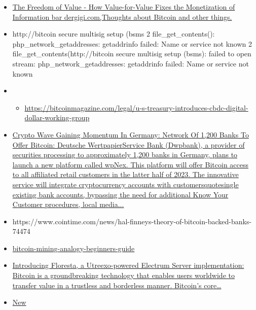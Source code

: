 \begin{itemize}
  \begin{itemize}
  \item
    \href{https://dergigi.com/2021/12/30/the-freedom-of-value/}{The
    Freedom of Value - How Value-for-Value Fixes the Monetization of
    Information bar{} dergigi.com,Thoughts about Bitcoin and other
    things.}
  \item
    http://bitcoin secure multisig setup (bsms 2 file\_get\_contents():
    php\_network\_getaddresses: getaddrinfo failed: Name or service not
    known 2 file\_get\_contents(http://bitcoin secure multisig setup
    (bsms): failed to open stream: php\_network\_getaddresses:
    getaddrinfo failed: Name or service not known
  \item
    \begin{itemize}
     
    \item
      \url{https://bitcoinmagazine.com/legal/u-s-treasury-introduces-cbdc-digital-dollar-working-group}
    \end{itemize}
  \item
    \href{https://www.msn.com/en-us/money/news/crypto-wave-gaining-momentum-in-germany-network-of-1-200-banks-to-offer-bitcoin/ar-AA198Lxc}{Crypto
    Wave Gaining Momentum In Germany: Network Of 1,200 Banks To Offer
    Bitcoin: Deutsche WertpapierService Bank (Dwpbank), a provider of
    securities processing to approximately 1,200 banks in Germany, plans
    to launch a new platform called wpNex. This platform will offer
    Bitcoin access to all affiliated retail customers in the latter half
    of 2023. The innovative service will integrate cryptocurrency
    accounts with customersquotesingle{} existing bank accounts,
    bypassing the need for additional Know Your Customer procedures,
    local media...}
  \item
    https://www.cointime.com/news/hal-finneys-theory-of-bitcoin-backed-banks-74474
  \item
    \href{https://braiins.com/blog/bitcoin-mining-analogy-beginners-guide}{bitcoin-mining-analogy-beginners-guide}
  \item
    \href{https://medium.com/vinteum-org/introducing-floresta-an-utreexo-powered-electrum-server-implementation-60feba8e179d}{Introducing
    Floresta, a Utreexo-powered Electrum Server implementation: Bitcoin
    is a groundbreaking technology that enables users worldwide to
    transfer value in a trustless and borderless manner. Bitcoin's
    core\ldots{}}
  \item
    \href{https://www.whitehouse.gov/wp-content/uploads/2023/03/ERP-2023.pdf}{New
}
\end{itemize}
\end{itemize}
